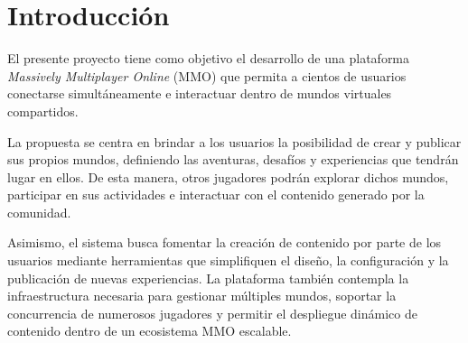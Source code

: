 \section{Introducción}

El presente proyecto tiene como objetivo el desarrollo de una plataforma \textit{Massively Multiplayer Online} (MMO)
que permita a cientos de usuarios conectarse simultáneamente e interactuar dentro de mundos virtuales compartidos.

La propuesta se centra en brindar a los usuarios la posibilidad de crear y publicar sus propios mundos, definiendo las aventuras,
desafíos y experiencias que tendrán lugar en ellos. De esta manera, otros jugadores podrán explorar dichos mundos,
participar en sus actividades e interactuar con el contenido generado por la comunidad.

Asimismo, el sistema busca fomentar la creación de contenido por parte de los usuarios mediante herramientas que
simplifiquen el diseño, la configuración y la publicación de nuevas experiencias. La plataforma también contempla
la infraestructura necesaria para gestionar múltiples mundos, soportar la concurrencia de numerosos jugadores y permitir
el despliegue dinámico de contenido dentro de un ecosistema MMO escalable.

